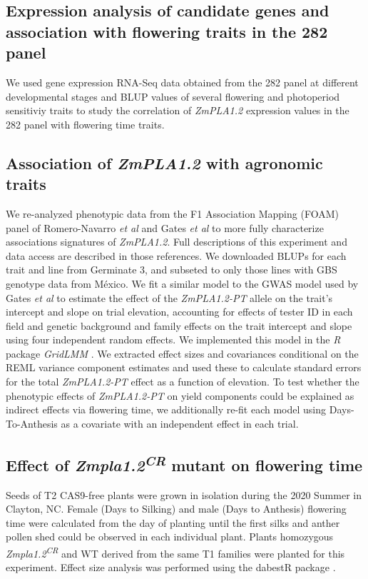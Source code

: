 \documentclass[9pt,twocolumn,twoside]{BioRxiv}
\begin{document}
\subsection{Expression analysis of candidate genes and association with flowering traits in the 282 panel}
We used gene expression RNA-Seq data obtained from the 282 panel at different developmental stages \cite{Kremling2018-gn} and BLUP values of several flowering and photoperiod sensitiviy traits \cite{Hung2012-ms} to study the correlation of \textit{ZmPLA1.2} expression values in the 282 panel with flowering time traits.  

\subsection{Association of \textit{ZmPLA1.2} with agronomic traits}
We re-analyzed phenotypic data from the F1 Association Mapping (FOAM) panel of Romero-Navarro \textit{et al} \cite{Romero_Navarro2017-cn} and Gates \textit{et al} \cite{Gates2019-xu} to more fully characterize associations signatures of \textit{ZmPLA1.2}. 
Full descriptions of this experiment and data access are described in those references. 
We downloaded BLUPs for each trait and line from Germinate 3, and subseted to only those lines with GBS genotype data from México. 
We fit a similar model to the GWAS model used by Gates \textit{et al} \cite{Gates2019-xu} to estimate the effect of the \textit{ZmPLA1.2-PT} allele on the trait's intercept and slope on trial elevation, accounting for effects of tester ID in each field and genetic background and family effects on the trait intercept and slope using four independent random effects. 
We implemented this model in the \textit{R} package \textit{GridLMM} \cite{Runcie2019-Gr}. 
We extracted effect sizes and covariances conditional on the REML variance component estimates and used these to calculate standard errors for the total \textit{ZmPLA1.2-PT} effect as a function of elevation. 
To test whether the phenotypic effects of \textit{ZmPLA1.2-PT} on yield components could be explained as indirect effects via flowering time, we additionally re-fit each model using Days-To-Anthesis as a covariate with an independent effect in each trial.

\subsection{Effect of \textit{Zmpla1.2\textsuperscript{CR}} mutant on flowering time}
Seeds of T2 CAS9-free plants were grown in isolation during the 2020 Summer in Clayton, NC. Female (Days to Silking) and male (Days to Anthesis) flowering time were calculated from the day of planting until the first silks and anther pollen shed could be observed in each individual plant. 
Plants homozygous \textit{Zmpla1.2\textsuperscript{CR}} and WT derived from the same T1 families were planted for this experiment. 
Effect size analysis was performed using the dabestR package \cite{Ho2019-yl}.
\end{document}
